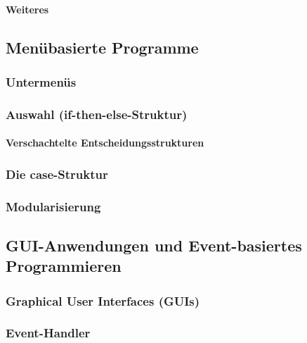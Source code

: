 \documentclass[a4paper, 11pt, accentcolor = tud3b]{tudreport}
\begin{document}
					\paragraph{Weiteres} %

			\subsection{Menübasierte Programme} %

				\subsubsection{Untermenüs} %

				\subsubsection{Auswahl (if-then-else-Struktur)} %

					\paragraph{Verschachtelte Entscheidungsstrukturen} %

				\subsubsection{Die case-Struktur} %

				\subsubsection{Modularisierung} %

			\subsection{GUI-Anwendungen und Event-basiertes Programmieren} %

				\subsubsection{Graphical User Interfaces (GUIs)} %

				\subsubsection{Event-Handler} %
\end{document}
